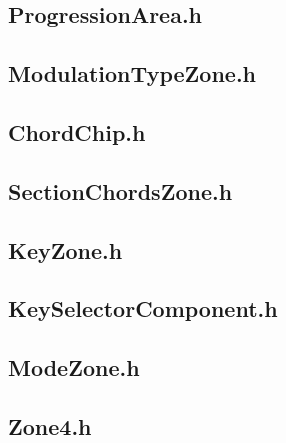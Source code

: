 \subsection{ProgressionArea.h}


\subsection{ModulationTypeZone.h}


\subsection{ChordChip.h}


\subsection{SectionChordsZone.h}


\subsection{KeyZone.h}


\subsection{KeySelectorComponent.h}


\subsection{ModeZone.h}


\subsection{Zone4.h}


